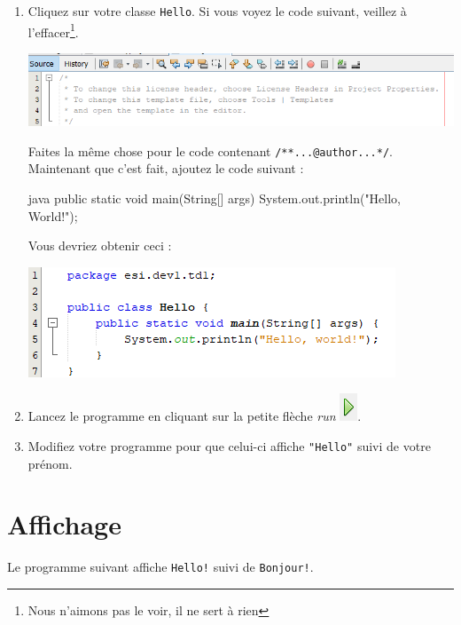 \documentclass[a4paper,11pt]{article}
\begin{document}
\begin{enumerate}
		\item Cliquez sur votre classe \texttt{Hello}. Si vous voyez le code suivant, 
		veillez à l'effacer\footnote{Nous n'aimons pas le voir, il ne sert à rien}. 
			\begin{center}
				\includegraphics[width=\textwidth]{images/nb_newproject_header}
			\end{center}
			Faites la même chose pour le code contenant \texttt{/**...@author...*/}.
			Maintenant que c'est fait, ajoutez le code suivant :
	\begin{Code}{java}
	public static void main(String[] args) {
		System.out.println("Hello, World!");
	}
	\end{Code}
			Vous devriez obtenir ceci :
			\begin{center}
				\includegraphics{images/nb_newproject_code}
			\end{center}
		\item Lancez le programme en cliquant sur la petite flèche \emph{run} 
		\includegraphics{images/nb_newproject_run}.

		\item Modifiez votre programme pour que celui-ci affiche \texttt{"Hello"} suivi de votre prénom.

	\end{enumerate}


\section{Affichage}

	Le programme suivant affiche \texttt{Hello!} suivi de \texttt{Bonjour!}.
\end{document}
